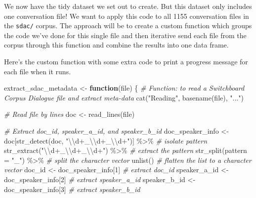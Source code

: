 \documentclass[
]{article}
\newenvironment{Shaded}{\begin{snugshade}}{\end{snugshade}}
\newcommand{\AttributeTok}[1]{\textcolor[rgb]{0.77,0.63,0.00}{#1}}
\newcommand{\CommentTok}[1]{\textcolor[rgb]{0.56,0.35,0.01}{\textit{#1}}}
\newcommand{\ControlFlowTok}[1]{\textcolor[rgb]{0.13,0.29,0.53}{\textbf{#1}}}
\newcommand{\DecValTok}[1]{\textcolor[rgb]{0.00,0.00,0.81}{#1}}
\newcommand{\FunctionTok}[1]{\textcolor[rgb]{0.00,0.00,0.00}{#1}}
\newcommand{\NormalTok}[1]{#1}
\newcommand{\OtherTok}[1]{\textcolor[rgb]{0.56,0.35,0.01}{#1}}
\newcommand{\SpecialCharTok}[1]{\textcolor[rgb]{0.00,0.00,0.00}{#1}}
\newcommand{\StringTok}[1]{\textcolor[rgb]{0.31,0.60,0.02}{#1}}
\begin{document}
We now have the tidy dataset we set out to create. But this dataset only includes one conversation file! We want to apply this code to all 1155 conversation files in the \texttt{sdac/} corpus. The approach will be to create a custom function which groups the code we've done for this single file and then iterative send each file from the corpus through this function and combine the results into one data frame.

Here's the custom function with some extra code to print a progress message for each file when it runs.

\begin{Shaded}
\begin{Highlighting}[]
\NormalTok{extract\_sdac\_metadata }\OtherTok{\textless{}{-}} \ControlFlowTok{function}\NormalTok{(file) \{}
  \CommentTok{\# Function: to read a Switchboard Corpus Dialogue file and extract meta{-}data}
  \FunctionTok{cat}\NormalTok{(}\StringTok{"Reading"}\NormalTok{, }\FunctionTok{basename}\NormalTok{(file), }\StringTok{"..."}\NormalTok{)}
  
  \CommentTok{\# Read \textasciigrave{}file\textasciigrave{} by lines}
\NormalTok{  doc }\OtherTok{\textless{}{-}} \FunctionTok{read\_lines}\NormalTok{(file) }
  
  \CommentTok{\# Extract \textasciigrave{}doc\_id\textasciigrave{}, \textasciigrave{}speaker\_a\_id\textasciigrave{}, and \textasciigrave{}speaker\_b\_id\textasciigrave{}}
\NormalTok{  doc\_speaker\_info }\OtherTok{\textless{}{-}} 
\NormalTok{    doc[}\FunctionTok{str\_detect}\NormalTok{(doc, }\StringTok{"}\SpecialCharTok{\textbackslash{}\textbackslash{}}\StringTok{d+\_}\SpecialCharTok{\textbackslash{}\textbackslash{}}\StringTok{d+\_}\SpecialCharTok{\textbackslash{}\textbackslash{}}\StringTok{d+"}\NormalTok{)] }\SpecialCharTok{\%\textgreater{}\%} \CommentTok{\# isolate pattern}
    \FunctionTok{str\_extract}\NormalTok{(}\StringTok{"}\SpecialCharTok{\textbackslash{}\textbackslash{}}\StringTok{d+\_}\SpecialCharTok{\textbackslash{}\textbackslash{}}\StringTok{d+\_}\SpecialCharTok{\textbackslash{}\textbackslash{}}\StringTok{d+"}\NormalTok{) }\SpecialCharTok{\%\textgreater{}\%} \CommentTok{\# extract the pattern}
    \FunctionTok{str\_split}\NormalTok{(}\AttributeTok{pattern =} \StringTok{"\_"}\NormalTok{) }\SpecialCharTok{\%\textgreater{}\%} \CommentTok{\# split the character vector}
    \FunctionTok{unlist}\NormalTok{() }\CommentTok{\# flatten the list to a character vector}
\NormalTok{  doc\_id }\OtherTok{\textless{}{-}}\NormalTok{ doc\_speaker\_info[}\DecValTok{1}\NormalTok{] }\CommentTok{\# extract \textasciigrave{}doc\_id\textasciigrave{}}
\NormalTok{  speaker\_a\_id }\OtherTok{\textless{}{-}}\NormalTok{ doc\_speaker\_info[}\DecValTok{2}\NormalTok{] }\CommentTok{\# extract \textasciigrave{}speaker\_a\_id\textasciigrave{}}
\NormalTok{  speaker\_b\_id }\OtherTok{\textless{}{-}}\NormalTok{ doc\_speaker\_info[}\DecValTok{3}\NormalTok{] }\CommentTok{\# extract \textasciigrave{}speaker\_b\_id\textasciigrave{}}
  

\end{Highlighting}
\end{Shaded}
\end{document}
